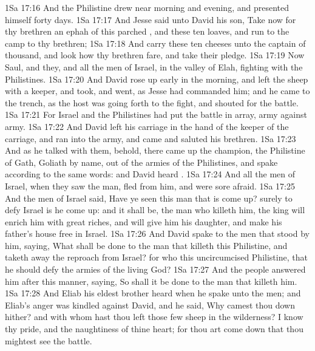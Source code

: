 \vs 1Sa 17:16 And the Philistine drew near morning and evening, and presented himself forty days.
\vs 1Sa 17:17 And Jesse said unto David his son, Take now for thy brethren an ephah of this parched , and these ten loaves, and run to the camp to thy brethren;
\vs 1Sa 17:18 And carry these ten cheeses unto the captain of  thousand, and look how thy brethren fare, and take their pledge.
\vs 1Sa 17:19 Now Saul, and they, and all the men of Israel,  in the valley of Elah, fighting with the Philistines.
\vs 1Sa 17:20 And David rose up early in the morning, and left the sheep with a keeper, and took, and went, as Jesse had commanded him; and he came to the trench, as the host was going forth to the fight, and shouted for the battle.
\vs 1Sa 17:21 For Israel and the Philistines had put the battle in array, army against army.
\vs 1Sa 17:22 And David left his carriage in the hand of the keeper of the carriage, and ran into the army, and came and saluted his brethren.
\vs 1Sa 17:23 And as he talked with them, behold, there came up the champion, the Philistine of Gath, Goliath by name, out of the armies of the Philistines, and spake according to the same words: and David heard .
\vs 1Sa 17:24 And all the men of Israel, when they saw the man, fled from him, and were sore afraid.
\vs 1Sa 17:25 And the men of Israel said, Have ye seen this man that is come up? surely to defy Israel is he come up: and it shall be,  the man who killeth him, the king will enrich him with great riches, and will give him his daughter, and make his father's house free in Israel.
\vs 1Sa 17:26 And David spake to the men that stood by him, saying, What shall be done to the man that killeth this Philistine, and taketh away the reproach from Israel? for who  this uncircumcised Philistine, that he should defy the armies of the living God?
\vs 1Sa 17:27 And the people answered him after this manner, saying, So shall it be done to the man that killeth him.
\vs 1Sa 17:28 And Eliab his eldest brother heard when he spake unto the men; and Eliab's anger was kindled against David, and he said, Why camest thou down hither? and with whom hast thou left those few sheep in the wilderness? I know thy pride, and the naughtiness of thine heart; for thou art come down that thou mightest see the battle.
